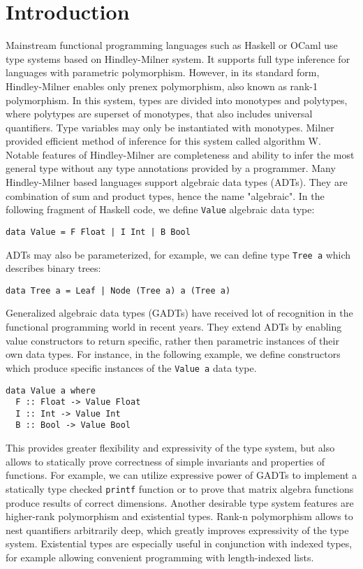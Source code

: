 \documentclass[declaration,shortabstract,english]{iithesis}
\author         {Konrad Werbliński}
\begin{document}

\chapter{Introduction}
Mainstream functional programming languages such as Haskell or OCaml use type systems
based on Hindley-Milner\cite{Hindley,Milner} system.
It supports full type inference for languages with parametric polymorphism.
However, in its standard form, Hindley-Milner enables only prenex polymorphism, also known as
rank-1 polymorphism. In this system, types are divided into monotypes and polytypes,
where polytypes are superset of monotypes, that also includes universal quantifiers.
Type variables may only be instantiated with monotypes. Milner provided efficient
method of inference for this system called algorithm W\cite{Milner}.
Notable features of Hindley-Milner are completeness and ability to infer the most general type
without any type annotations provided by a programmer. Many Hindley-Milner based languages
support algebraic data types (ADTs). They are combination of sum and product types, hence the name "algebraic".
In the following fragment of Haskell code, we define \verb+Value+ algebraic data type:
\begin{verbatim}
data Value = F Float | I Int | B Bool
\end{verbatim}
ADTs may also be parameterized, for example, we can define type \verb+Tree a+ which describes binary trees:
\begin{verbatim}
data Tree a = Leaf | Node (Tree a) a (Tree a)
\end{verbatim}

Generalized algebraic data types (GADTs)\cite{grd,fcpt} have received lot of recognition in
the functional programming world in recent years. They extend ADTs by enabling value constructors to return specific, rather
then parametric instances of their own data types. For instance, in the following example, we define
constructors which produce specific instances of the \verb+Value a+ data type.
\begin{verbatim}
data Value a where
  F :: Float -> Value Float
  I :: Int -> Value Int
  B :: Bool -> Value Bool
\end{verbatim}
This provides greater flexibility and expressivity of the type system,
but also allows to statically prove correctness of simple invariants and properties of functions.
For example, we can utilize expressive power of GADTs to implement a statically type checked \verb+printf+ function
or to prove that matrix algebra functions produce results of correct dimensions. Another desirable type system
features are higher-rank polymorphism and existential types. Rank-n polymorphism allows to nest quantifiers
arbitrarily deep, which greatly improves expressivity of the type system. Existential types are especially useful
in conjunction with indexed types, for example allowing convenient programming with length-indexed lists.
\end{document}
